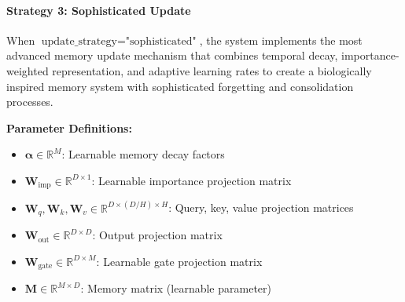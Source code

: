 \documentclass{article}
\begin{document}
\paragraph{Strategy 3: Sophisticated Update}

When $\text{update\_strategy} = \text{"sophisticated"}$, the system implements the most advanced memory update mechanism that combines temporal decay, importance-weighted representation, and adaptive learning rates to create a biologically inspired memory system with sophisticated forgetting and consolidation processes.

\textbf{Parameter Definitions:}
\begin{itemize}
\item $\boldsymbol{\alpha} \in \mathbb{R}^{M}$: Learnable memory decay factors
\item $\mathbf{W}_{\text{imp}} \in \mathbb{R}^{D \times 1}$: Learnable importance projection matrix
\item $\mathbf{W}_q, \mathbf{W}_k, \mathbf{W}_v \in \mathbb{R}^{D \times (D/H) \times H}$: Query, key, value projection matrices
\item $\mathbf{W}_{\text{out}} \in \mathbb{R}^{D \times D}$: Output projection matrix
\item $\mathbf{W}_{\text{gate}} \in \mathbb{R}^{D \times M}$: Learnable gate projection matrix
\item $\mathbf{M} \in \mathbb{R}^{M \times D}$: Memory matrix (learnable parameter)
\end{itemize}
\end{document}
